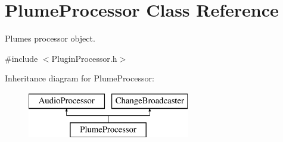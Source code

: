 \hypertarget{class_plume_processor}{}\section{Plume\+Processor Class Reference}
\label{class_plume_processor}


Plume\textquotesingle{}s processor object.  




{\ttfamily \#include $<$Plugin\+Processor.\+h$>$}

Inheritance diagram for Plume\+Processor\+:\begin{figure}[H]
\begin{center}
\leavevmode
\includegraphics[height=2.000000cm]{class_plume_processor}
\end{center}
\end{figure}
